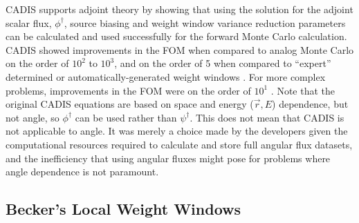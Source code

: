 CADIS supports adjoint theory by showing that using the
solution for the adjoint scalar
flux, $\phi^{\dagger}$, source biasing and weight window
variance reduction parameters can be calculated and used successfully
for the forward Monte Carlo calculation. CADIS showed improvements in the FOM
when compared to analog Monte Carlo on the order of $10^2$ to $10^3$,
and on the order of 5
when compared to ``expert'' determined or automatically-generated weight
windows \cite{wagner_automated_1998, wagner_automated_2002}. For more complex
problems, improvements in the FOM were on the order of $10^1$
\cite{wagner_automatic_1997, wagner_automated_1998}.
Note that the original CADIS equations
are based on space and energy ($\vec{r}, E$) dependence, but not angle, so
$\phi^{\dagger}$ can be used rather than $\psi^{\dagger}$. This does not mean
that CADIS is not applicable to angle. It was merely a choice made by the
developers given the computational resources required to calculate and store
full angular flux datasets, and the inefficiency that using angular fluxes might
pose for problems where angle dependence is not paramount.

\subsection{Becker's Local Weight Windows}
\label{sec:beckerlocal}

